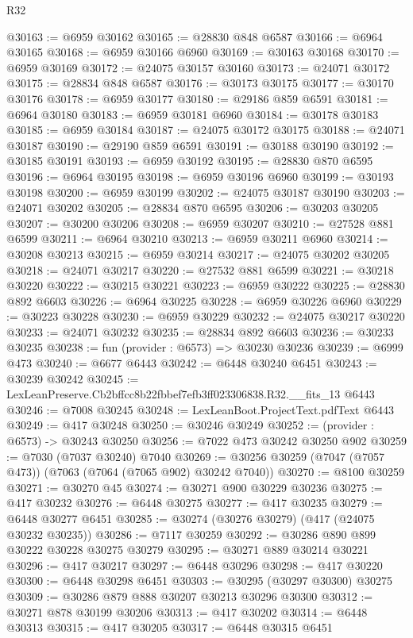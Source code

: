 \begin{lexlean}{R32}
\begin{coremodule}
@30163 := @6959 @30162
@30165 := @28830 @848 @6587
@30166 := @6964 @30165
@30168 := @6959 @30166 @6960
@30169 := @30163 @30168
@30170 := @6959 @30169
@30172 := @24075 @30157 @30160
@30173 := @24071 @30172
@30175 := @28834 @848 @6587
@30176 := @30173 @30175
@30177 := @30170 @30176
@30178 := @6959 @30177
@30180 := @29186 @859 @6591
@30181 := @6964 @30180
@30183 := @6959 @30181 @6960
@30184 := @30178 @30183
@30185 := @6959 @30184
@30187 := @24075 @30172 @30175
@30188 := @24071 @30187
@30190 := @29190 @859 @6591
@30191 := @30188 @30190
@30192 := @30185 @30191
@30193 := @6959 @30192
@30195 := @28830 @870 @6595
@30196 := @6964 @30195
@30198 := @6959 @30196 @6960
@30199 := @30193 @30198
@30200 := @6959 @30199
@30202 := @24075 @30187 @30190
@30203 := @24071 @30202
@30205 := @28834 @870 @6595
@30206 := @30203 @30205
@30207 := @30200 @30206
@30208 := @6959 @30207
@30210 := @27528 @881 @6599
@30211 := @6964 @30210
@30213 := @6959 @30211 @6960
@30214 := @30208 @30213
@30215 := @6959 @30214
@30217 := @24075 @30202 @30205
@30218 := @24071 @30217
@30220 := @27532 @881 @6599
@30221 := @30218 @30220
@30222 := @30215 @30221
@30223 := @6959 @30222
@30225 := @28830 @892 @6603
@30226 := @6964 @30225
@30228 := @6959 @30226 @6960
@30229 := @30223 @30228
@30230 := @6959 @30229
@30232 := @24075 @30217 @30220
@30233 := @24071 @30232
@30235 := @28834 @892 @6603
@30236 := @30233 @30235
@30238 := fun (provider : @6573) => @30230 @30236
@30239 := @6999 @473
@30240 := @6677 @6443
@30242 := @6448 @30240 @6451
@30243 := @30239 @30242
@30245 := LexLeanPreserve.Cb2bffcc8b22fbbef7efb3ff023306838.R32.__fits_13 @6443
@30246 := @7008 @30245
@30248 := LexLeanBoot.ProjectText.pdfText @6443
@30249 := @417 @30248
@30250 := @30246 @30249
@30252 := (provider : @6573) -> @30243 @30250
@30256 := @7022 @473 @30242 @30250 @902
@30259 := @7030 (@7037 @30240) @7040
@30269 := @30256 @30259 (@7047 (@7057 @473)) (@7063 (@7064 (@7065 @902) @30242 @7040))
@30270 := @8100 @30259
@30271 := @30270 @45
@30274 := @30271 @900 @30229 @30236
@30275 := @417 @30232
@30276 := @6448 @30275
@30277 := @417 @30235
@30279 := @6448 @30277 @6451
@30285 := @30274 (@30276 @30279) (@417 (@24075 @30232 @30235))
@30286 := @7117 @30259
@30292 := @30286 @890 @899 @30222 @30228 @30275 @30279
@30295 := @30271 @889 @30214 @30221
@30296 := @417 @30217
@30297 := @6448 @30296
@30298 := @417 @30220
@30300 := @6448 @30298 @6451
@30303 := @30295 (@30297 @30300) @30275
@30309 := @30286 @879 @888 @30207 @30213 @30296 @30300
@30312 := @30271 @878 @30199 @30206
@30313 := @417 @30202
@30314 := @6448 @30313
@30315 := @417 @30205
@30317 := @6448 @30315 @6451

\end{coremodule}
\end{lexlean}
